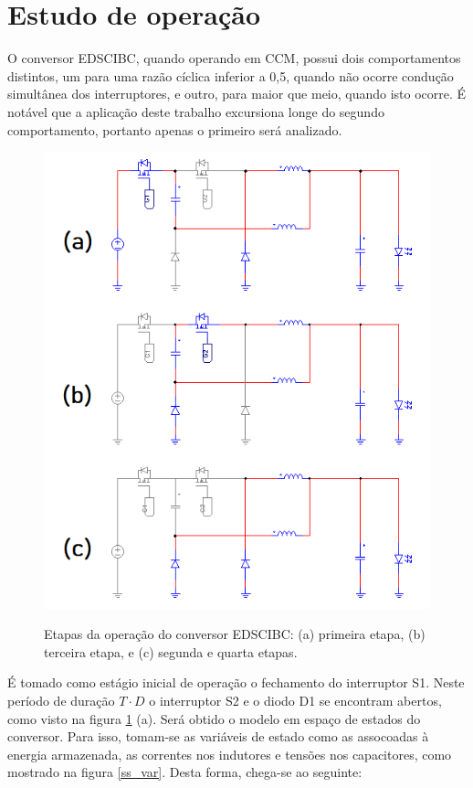\documentclass[
        12pt,
        openany, %
        oneside, %
        a4paper,			
        english,			
        brazil
        ]{abntbibufjf}
\begin{document}
\section{Estudo de operação}

O conversor EDSCIBC, quando operando em CCM, possui dois comportamentos distintos, um para uma razão cíclica inferior a 0,5, quando não ocorre condução simultânea dos interruptores, e outro, para maior que meio, quando isto ocorre. É notável que a aplicação deste trabalho excursiona longe do segundo comportamento, portanto apenas o primeiro será analizado.

\begin{figure}[!h]
	\centering
	\caption{Etapas da operação do conversor EDSCIBC: (a) primeira etapa, (b) terceira etapa, e (c) segunda e quarta etapas.}
	\includegraphics[scale=.8]{../ESQUEMAS/split.PNG}\\
	\label{modos}
\end{figure}

É tomado como estágio inicial de operação o fechamento do interruptor S1. Neste período de duração $T \cdot D$ o interruptor S2 e o diodo D1 se encontram abertos, como visto na figura \ref{modos} (a). Será obtido o modelo em espaço de estados do conversor. Para isso, tomam-se as variáveis de estado como as assocoadas à energia armazenada, as correntes nos indutores e tensões nos capacitores, como mostrado na figura \ref{ss_var}. Desta forma, chega-se ao seguinte:
\end{document}
